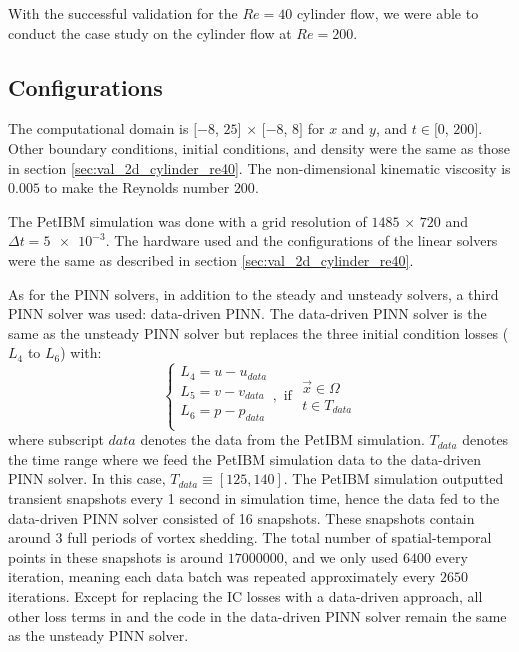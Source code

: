 
With the successful validation for the $Re=40$ cylinder flow, we were able to conduct the case study on the cylinder flow at $Re=200$.

\subsection{Configurations}

The computational domain is $[-8$, $25]$ $\times$ $[-8$, $8]$ for $x$ and $y$, and $t\in[0$, $200]$.
Other boundary conditions, initial conditions, and density were the same as those in section \ref{sec:val_2d_cylinder_re40}.
The non-dimensional kinematic viscosity is $0.005$ to make the Reynolds number $200$.

The PetIBM simulation was done with a grid resolution of $1485$ $\times$ $720$ and $\Delta t = \num{5e-3}$.
The hardware used and the configurations of the linear solvers were the same as described in section \ref{sec:val_2d_cylinder_re40}.

As for the PINN solvers, in addition to the steady and unsteady solvers, a third PINN solver was used: data-driven PINN.
The data-driven PINN solver is the same as the unsteady PINN solver but replaces the three initial condition losses ($L_4$ to $L_6$) with:
\begin{equation}\label{eq:data-driven-loss}
    \left\{
        \begin{array}{l}
            L_4 = u - u_{data}\\
            L_5 = v - v_{data}\\
            L_6 = p - p_{data}\\
        \end{array}
    \right.
    ,\text{ if }
    \begin{array}{l}
        \vec{x} \in \Omega \\
        t \in T_{data}
    \end{array}
\end{equation}
where subscript $data$ denotes the data from the PetIBM simulation.
$T_{data}$ denotes the time range where we feed the PetIBM simulation data to the data-driven PINN solver.
In this case, $T_{data} \equiv \left[125, 140\right]$.
The PetIBM simulation outputted transient snapshots every 1 second in simulation time, hence the data fed to the data-driven PINN solver consisted of 16 snapshots.
These snapshots contain around $3$ full periods of vortex shedding.
The total number of spatial-temporal points in these snapshots is around $\num{17000000}$, and we only used $\num{6400}$ every iteration, meaning each data batch was repeated approximately every $\num{2650}$ iterations.
Except for replacing the IC losses with a data-driven approach, all other loss terms in and the code in the data-driven PINN solver remain the same as the unsteady PINN solver.

